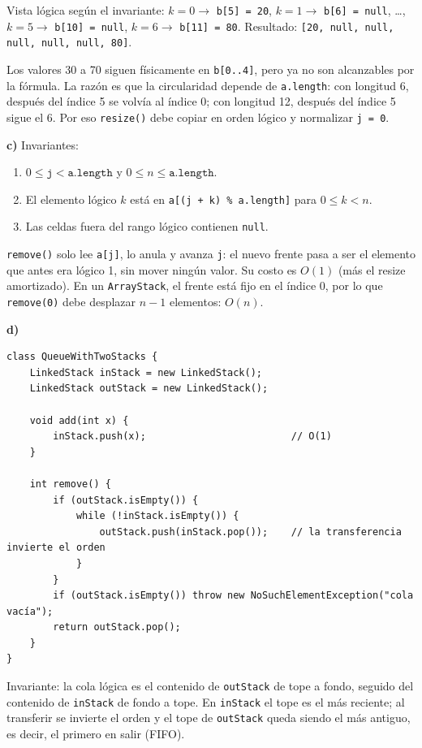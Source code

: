 \documentclass[11pt,a4paper]{article}
\begin{document}
Vista lógica según el invariante: $k = 0 \to$ \texttt{b[5] = 20}, $k = 1 \to$ \texttt{b[6] = null}, \dots, $k = 5 \to$ \texttt{b[10] = null}, $k = 6 \to$ \texttt{b[11] = 80}. Resultado: \texttt{[20, null, null, null, null, null, 80]}.

Los valores 30 a 70 siguen físicamente en \texttt{b[0..4]}, pero ya no son alcanzables por la fórmula. La razón es que la circularidad depende de \texttt{a.length}: con longitud 6, después del índice 5 se volvía al índice 0; con longitud 12, después del índice 5 sigue el 6. Por eso \texttt{resize()} debe copiar en orden lógico y normalizar \texttt{j = 0}.

\textbf{c)} Invariantes:
\begin{enumerate}[itemsep=0pt]
\item $0 \le \texttt{j} < \texttt{a.length}$ y $0 \le n \le \texttt{a.length}$.
\item El elemento lógico $k$ está en \texttt{a[(j + k) \% a.length]} para $0 \le k < n$.
\item Las celdas fuera del rango lógico contienen \texttt{null}.
\end{enumerate}
\texttt{remove()} solo lee \texttt{a[j]}, lo anula y avanza \texttt{j}: el nuevo frente pasa a ser el elemento que antes era lógico 1, sin mover ningún valor. Su costo es $O(1)$ (más el resize amortizado). En un \texttt{ArrayStack}, el frente está fijo en el índice 0, por lo que \texttt{remove(0)} debe desplazar $n - 1$ elementos: $O(n)$.

\textbf{d)}
\begin{lstlisting}
class QueueWithTwoStacks {
    LinkedStack inStack = new LinkedStack();
    LinkedStack outStack = new LinkedStack();

    void add(int x) {
        inStack.push(x);                         // O(1)
    }

    int remove() {
        if (outStack.isEmpty()) {
            while (!inStack.isEmpty()) {
                outStack.push(inStack.pop());    // la transferencia invierte el orden
            }
        }
        if (outStack.isEmpty()) throw new NoSuchElementException("cola vacía");
        return outStack.pop();
    }
}
\end{lstlisting}

Invariante: la cola lógica es el contenido de \texttt{outStack} de tope a fondo, seguido del contenido de \texttt{inStack} de fondo a tope. En \texttt{inStack} el tope es el más reciente; al transferir se invierte el orden y el tope de \texttt{outStack} queda siendo el más antiguo, es decir, el primero en salir (FIFO).
\end{document}

